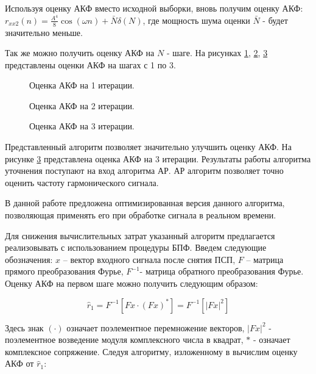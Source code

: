 Используя оценку АКФ вместо исходной выборки, вновь получим оценку АКФ:
${r_{xx2}(n) = \frac{A^4}{8} \cos{(\omega n)} + \bar{N} \delta{(N)}}$,
где мощность шума оценки ${\bar{N}}$ - будет значительно меньше.

Так же можно получить оценку АКФ на ${N}$ - шаге. На рисунках \ref{pic:lpc_1_iter},
\ref{pic:lpc_2_iter}, \ref{pic:lpc_3_iter} представлены оценки АКФ на шагах с 1 по 3.

\begin{figure}[H]
	\center{}
	\caption{Оценка АКФ на 1 итерации.}
	\label{pic:lpc_1_iter}
\end{figure}

\begin{figure}[H]
	\center{}
	\caption{Оценка АКФ на 2 итерации.}
	\label{pic:lpc_2_iter}
\end{figure}

\begin{figure}[H]
	\center{}
	\caption{Оценка АКФ на 3 итерации.}
	\label{pic:lpc_3_iter}
\end{figure}

Представленный алгоритм позволяет значительно улучшить оценку АКФ. На рисунке \ref{pic:lpc_3_iter} представлена оценка АКФ на 3 итерации.
Результаты работы алгоритма уточнения поступают на вход алгоритма АР. АР алгоритм позволяет точно оценить частоту гармонического сигнала.

В данной работе предложена оптимизированная версия данного алгоритма, позволяющая применять его при обработке сигнала в реальном времени.

Для снижения вычислительных затрат указанный алгоритм предлагается реализовывать с использованием процедуры БПФ. 
Введем следующие обозначения: ${x}$ – вектор входного сигнала после снятия ПСП, ${F}$ – матрица прямого преобразования Фурье, ${F^{-1}}$- матрица обратного преобразования Фурье.
Оценку АКФ на первом шаге можно получить следующим образом:

\begin{center}
\begin{equation}
	\label{eq:akf_1}
	\hat{r}_1 = F^{-1}\left[ Fx \cdot (Fx)^* \right] = F^{-1} \left[ \left| Fx \right| ^2 \right]
\end{equation}
\end{center}

Здесь знак ${(\cdot)}$  означает поэлементное перемножение векторов, ${\left| Fx \right| ^2}$ - поэлементное возведение модуля комплексного числа в квадрат, ${*}$ - означает
комплексное сопряжение.  Следуя алгоритму, изложенному в \cite{ostanin_akf} вычислим оценку АКФ от ${\hat{r}_1}$:

